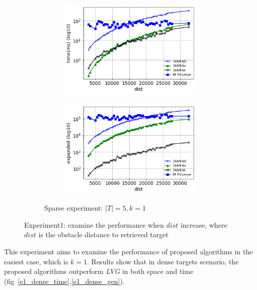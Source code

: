 \begin{figure}[!htb]
  \begin{subfigure}{\linewidth}
    \begin{subfigure}{0.5\textwidth}
        \centering
        \includegraphics[width=.9\textwidth]{pic/e1_sparse_time.png}
        \caption{}
        \label{e1_sparse_time}
    \end{subfigure}%
    \hfill
    \begin{subfigure}{0.5\textwidth}
        \centering
        \includegraphics[width=.9\textwidth]{pic/e1_sparse_gen.png}
        \caption{}
        \label{e1_sparse_gen}
    \end{subfigure}
    \caption*{\small Sparse experiment: $|T| = 5, k=1$}
  \end{subfigure}
  \caption{\small Experiment1: examine the performance when $dist$ increase, where
  $dist$ is the obstacle distance to retrieved target}
\end{figure}

This experiment aims to examine the performance of proposed algorithms in the easiest case, which is $k=1$.
Results show that in dense targets scenario, the proposed algorithms outperform \textit{LVG} in both space and time (fig~\ref{e1_dense_time},\ref{e1_dense_gen}).


